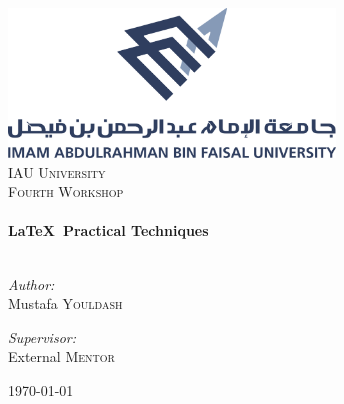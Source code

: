\begin{titlepage}
 
	\begin{center}
 
		\includegraphics[width=0.65\textwidth]{1200px-IAU}\\[1cm]
 
		\textsc{\LARGE IAU University}\\[1.5cm]
		\textsc{\Large Fourth Workshop}\\[0.5cm]
 
		\HRule \\[0.4cm]
		{ \huge \bfseries \LaTeX\ Practical Techniques}\\[0.4cm]
 
		\HRule \\[1.5cm]
 
		\begin{minipage}{0.4\textwidth}
		\begin{flushleft} \large
		\emph{Author:}\\
		Mustafa \textsc{Youldash}
		\end{flushleft}
		\end{minipage}
		\begin{minipage}{0.4\textwidth}
		\begin{flushright} \large
		\emph{Supervisor:} \\
		External \textsc{Mentor}
		\end{flushright}
		\end{minipage}
 
		\vfill
 
		\vfill
 
		{\large \today}
 
	\end{center}
 
\end{titlepage}
